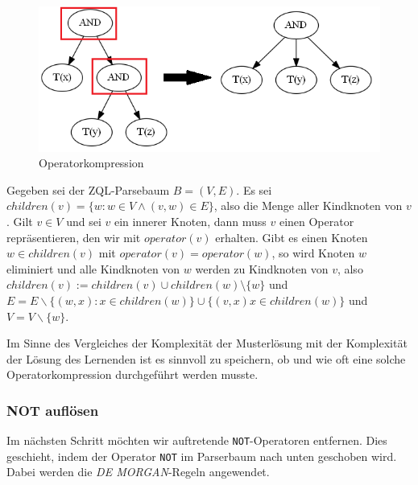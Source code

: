 \begin{figure}[h]
\centering
\includegraphics[scale=0.4]{Bilder/op_comp.png}
\caption{Operatorkompression}
\label{fig:opcomp}
\end{figure}

Gegeben sei der ZQL-Parsebaum $B=(V,E)$. Es sei $children(v) = \{ w : w\in V \wedge (v,w)\in E\}$, also die Menge aller Kindknoten von $v$. Gilt $v\in V$ und sei $v$ ein innerer Knoten, dann muss $v$ einen Operator repräsentieren, den wir mit $\mathit{operator}(v)$ erhalten. Gibt es einen Knoten $w\in children(v)$ mit $\mathit{operator}(v)=\mathit{operator}(w)$, so wird Knoten $w$ eliminiert und alle Kindknoten von $w$ werden zu Kindknoten von $v$, also $children(v) := children(v) \cup children(w) \setminus \{w\}$ und $E=E\backslash \{ (w,x) : x\in children(w)\} \cup \{(v,x) x\in children(w)\}$ und $V=V\backslash \{w\}$.

Im Sinne des Vergleiches der Komplexität der Musterlösung mit der Komplexität der Lösung des Lernenden ist es sinnvoll zu speichern, ob und wie oft eine solche Operatorkompression durchgeführt werden musste.

\subsubsection{NOT auflösen}

Im nächsten Schritt möchten wir auftretende \verb|NOT|-Operatoren entfernen. Dies geschieht, indem der Operator \verb|NOT| im Parserbaum nach unten geschoben wird. Dabei werden die \textit{DE MORGAN}-Regeln angewendet. 

